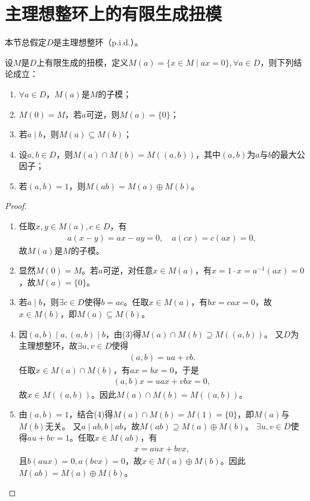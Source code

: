 \documentclass[../../main.tex]{subfiles}%
\begin{document}
\section{主理想整环上的有限生成扭模}

本节总假定$D$是主理想整环（p.i.d.）。

\begin{lemma}
设$M$是$D$上有限生成的扭模，定义$M(a)=\{x\in M\mid ax=0\},\forall a\in D$，则下列结论成立：
\begin{enumerate}[(1)]
\item $\forall a\in D$，$M(a)$是$M$的子模；
\item $M(0)=M$，若$a$可逆，则$M(a)=\{0\}$；
\item 若$a\mid b$，则$M(a)\subseteq M(b)$；
\item 设$a,b\in D$，则$M(a)\cap M(b)=M((a,b))$，其中$(a,b)$为$a$与$b$的最大公因子；
\item 若$(a,b)=1$，则$M(ab)=M(a)\oplus M(b)$。
\end{enumerate}
\end{lemma}
\begin{proof}
\begin{enumerate}[(1)]
\item 任取$x,y\in M(a),c\in D$，有
\begin{align*}
a(x-y)=ax-ay=0,\quad a(cx)=c(ax)=0,
\end{align*}
故$M(a)$是$M$的子模。

\item 显然$M(0)=M$。若$a$可逆，对任意$x\in M(a)$，有$x=1\cdot x=a^{-1}(ax)=0$，故$M(a)=\{0\}$。

\item 若$a\mid b$，则$\exists c\in D$使得$b=ac$。任取$x\in M(a)$，有$bx=cax=0$，故$x\in M(b)$，即$M(a)\subseteq M(b)$。

\item 因$(a,b)\mid a,(a,b)\mid b$，由(3)得$M(a)\cap M(b)\supseteq M((a,b))$。
又$D$为主理想整环，故$\exists u,v\in D$使得
\begin{align*}
(a,b)=ua+vb.
\end{align*}
任取$x\in M(a)\cap M(b)$，有$ax=bx=0$，于是
\begin{align*}
(a,b)x=uax+vbx=0,
\end{align*}
故$x\in M((a,b))$。因此$M(a)\cap M(b)=M((a,b))$。

\item 由$(a,b)=1$，结合(4)得$M(a)\cap M(b)=M(1)=\{0\}$，即$M(a)$与$M(b)$无关。
又$a\mid ab,b\mid ab$，故$M(ab)\supseteq M(a)\oplus M(b)$。
$\exists u,v\in D$使得$au+bv=1$。任取$x\in M(ab)$，有
\begin{align*}
x=aux+bvx,
\end{align*}
且$b(aux)=0,a(bvx)=0$，故$x\in M(a)\oplus M(b)$。因此$M(ab)=M(a)\oplus M(b)$。
\end{enumerate}
\end{proof}
\end{document}
